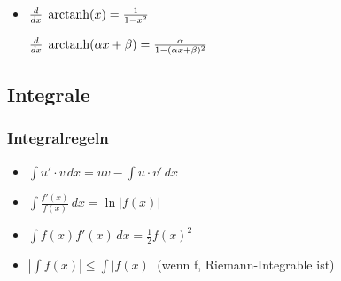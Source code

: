 \begin{itemize}[leftmargin=*]
	\item 
	{\small
	\begin{minipage}{0.4\columnwidth}
		$\frac{d}{dx}\; \operatorname{arctanh}(x) = \frac{1}{1-x^2}$
	\end{minipage}
	\begin{minipage}{0.55\columnwidth}
		$\frac{d}{dx}\; \operatorname{arctanh}(\alpha x + \beta) = \frac{\alpha}{1 - (\alpha x + \beta)^2}$
	\end{minipage}}
\end{itemize}

\subsection{Integrale}
\subsubsection{Integralregeln}
\begin{itemize}[leftmargin=*]
	\item $\int u'\cdot v \, dx = uv - \int u \cdot v' \, dx$
	\item $\int \frac{f'(x)}{f(x)} \, dx = \ln|f(x)|$
	\item $\int f(x)f'(x) \, dx = \frac{1}{2}f(x)^2$
	\item $|\int f(x)| \leq \int |f(x)|$ (wenn f, Riemann-Integrable ist)
\end{itemize}

